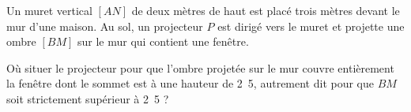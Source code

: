 
\begin{exercice}\label{exosmath-0379}

    Un muret vertical \( [AN]\) de deux mètres de haut est placé trois mètres devant le mur d'une maison. Au sol, un projecteur \( P\) est dirigé vers le muret et projette une ombre \( [BM]\) sur le mur qui contient une fenêtre.

    Où situer le projecteur pour que l'ombre projetée sur le mur couvre entièrement la fenêtre dont le sommet est à une hauteur de \unit{2.5}{\meter}, autrement dit pour que \( BM\) soit strictement supérieur à \unit{2.5}{\meter} ?

    \begin{center}

    \end{center}

\end{exercice}
